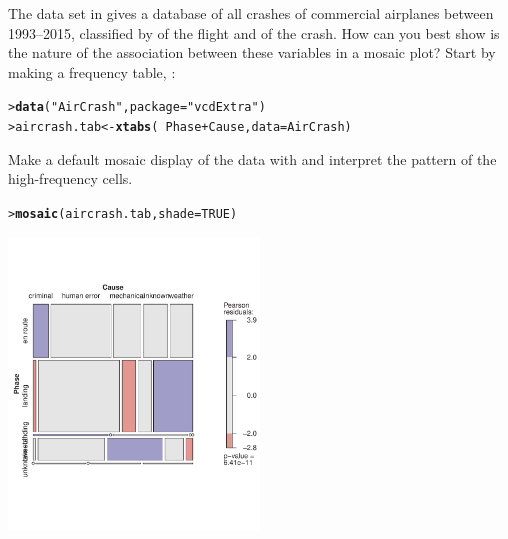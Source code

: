 \documentclass[10pt]{report}\usepackage[]{graphicx}\usepackage[]{color}
\makeatletter
\newcommand{\hlnum}[1]{\textcolor[rgb]{0.686,0.059,0.569}{#1}}%
\newcommand{\hlstr}[1]{\textcolor[rgb]{0.192,0.494,0.8}{#1}}%
\newcommand{\hlopt}[1]{\textcolor[rgb]{0,0,0}{#1}}%
\newcommand{\hlstd}[1]{\textcolor[rgb]{0.345,0.345,0.345}{#1}}%
\newcommand{\hlkwb}[1]{\textcolor[rgb]{0.69,0.353,0.396}{#1}}%
\newcommand{\hlkwc}[1]{\textcolor[rgb]{0.333,0.667,0.333}{#1}}%
\newcommand{\hlkwd}[1]{\textcolor[rgb]{0.737,0.353,0.396}{\textbf{#1}}}%
\newenvironment{kframe}{%
 \def\at@end@of@kframe{}%
 \ifinner\ifhmode%
  \def\at@end@of@kframe{\end{minipage}}%
  \begin{minipage}{\columnwidth}%
 \fi\fi%
 \def\FrameCommand##1{\hskip\@totalleftmargin \hskip-\fboxsep
 \colorbox{shadecolor}{##1}\hskip-\fboxsep
     \hskip-\linewidth \hskip-\@totalleftmargin \hskip\columnwidth}%
 \MakeFramed {\advance\hsize-\width
   \@totalleftmargin\z@ \linewidth\hsize
   \@setminipage}}%
 {\par\unskip\endMakeFramed%
 \at@end@of@kframe}
\newenvironment{knitrout}{}{} %
\renewenvironment{knitrout}{\small\renewcommand{\baselinestretch}{.85}}{} %
\makeatother
\begin{document}
\begin{Exercises}
\exercise\label{lab:mosaic-crash} The data set  in  gives a database of all crashes of commercial airplanes
between 1993--2015, classified by  of the flight and  of the crash.  How can you best show is the nature of the
association between these variables in a mosaic plot?  Start by making a frequency table, :
\begin{knitrout}\footnotesize
{}\color{fgcolor}\begin{kframe}
\begin{alltt}
\hlstd{> }\hlkwd{data}\hlstd{(}\hlstr{"AirCrash"}\hlstd{,} \hlkwc{package} \hlstd{=} \hlstr{"vcdExtra"}\hlstd{)}
\hlstd{> }\hlstd{aircrash.tab} \hlkwb{<-} \hlkwd{xtabs}\hlstd{(}\hlopt{~} \hlstd{Phase} \hlopt{+} \hlstd{Cause,} \hlkwc{data} \hlstd{= AirCrash)}
\end{alltt}
\end{kframe}
\end{knitrout}
  \begin{enumerate*}
    \item Make a default mosaic display of the data with  and interpret the pattern of the high-frequency cells.
    \begin{ans}
\begin{knitrout}\footnotesize
{}\color{fgcolor}\begin{kframe}
\begin{alltt}
\hlstd{> } \hlkwd{mosaic}\hlstd{(aircrash.tab,} \hlkwc{shade}\hlstd{=}\hlnum{TRUE}\hlstd{)}
\end{alltt}
\end{kframe}

\centerline{\includegraphics[width=0.5\textwidth]{soln/fig/ex5_2a-1} }




\end{knitrout}
\end{ans}
\end{enumerate*}
\end{Exercises}
\end{document}

